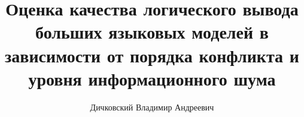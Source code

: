 \documentclass[12pt, a4paper]{article}
\begin{document}
\title{Оценка качества логического вывода больших языковых моделей в зависимости от порядка конфликта и уровня информационного шума}
\author{Дичковский Владимир Андреевич}
\date{}
\maketitle





\end{document}
